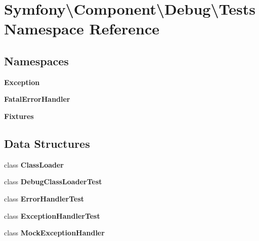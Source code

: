\section{Symfony\textbackslash{}Component\textbackslash{}Debug\textbackslash{}Tests Namespace Reference}
\label{namespace_symfony_1_1_component_1_1_debug_1_1_tests}
\subsection*{Namespaces}
\begin{DoxyCompactItemize}
\item 
 {\bf Exception}
\item 
 {\bf Fatal\+Error\+Handler}
\item 
 {\bf Fixtures}
\end{DoxyCompactItemize}
\subsection*{Data Structures}
\begin{DoxyCompactItemize}
\item 
class {\bf Class\+Loader}
\item 
class {\bf Debug\+Class\+Loader\+Test}
\item 
class {\bf Error\+Handler\+Test}
\item 
class {\bf Exception\+Handler\+Test}
\item 
class {\bf Mock\+Exception\+Handler}
\end{DoxyCompactItemize}
